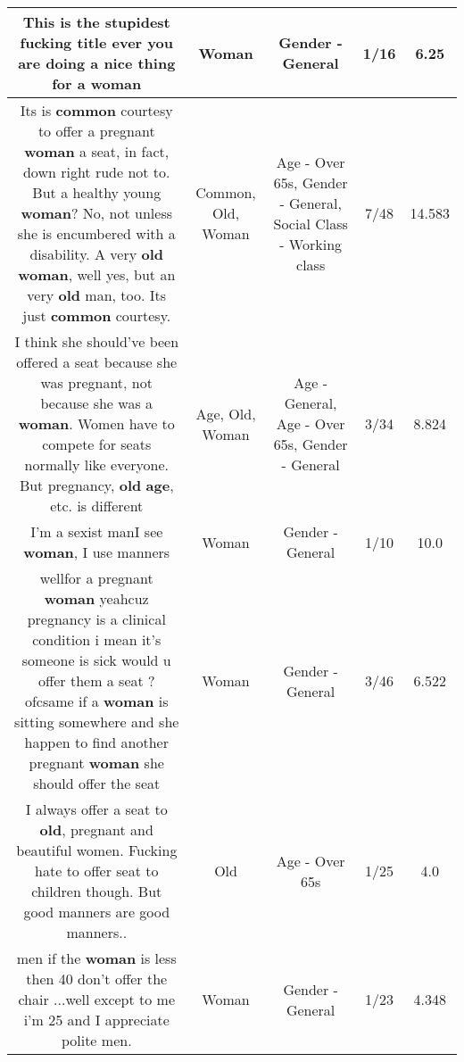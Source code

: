\documentclass[11pt]{article}
\newlength\mylength
\begin{document}
\begin{center}
\begin{longtable}{|C{.65\mylength}|C{.30\mylength}|C{.12\mylength}|C{.12\mylength}|C{.12\mylength}|}
  \small This is the stupidest fucking title ever you are doing a nice thing for a woman\normalsize   & Woman & Gender - General & 1/16 & 6.25 \\  \hline
  \small Its is \textbf{common} courtesy to offer a pregnant \textbf{woman} a seat, in fact, down right rude not to.  But a healthy young \textbf{woman}?  No, not unless she is encumbered with a disability.  A very \textbf{old} \textbf{woman}, well yes, but an very \textbf{old} man, too.  Its just \textbf{common} courtesy.\normalsize   & Common, Old, Woman & Age - Over 65s, Gender - General, Social Class - Working class & 7/48 & 14.583 \\  \hline
  \small I think she should've been offered a seat because she was pregnant, not because she was a \textbf{woman}. Women have to compete for seats normally like everyone. But pregnancy, \textbf{old} \textbf{age}, etc. is different\normalsize   & Age, Old, Woman & Age - General, Age - Over 65s, Gender - General & 3/34 & 8.824 \\  \hline
  \small I'm a sexist manI see \textbf{woman}, I use manners\normalsize   & Woman & Gender - General & 1/10 & 10.0 \\  \hline
  \small wellfor a pregnant \textbf{woman} yeahcuz pregnancy is a clinical condition i mean it's someone is sick would u offer them a seat ? ofcsame if a \textbf{woman} is sitting somewhere and she happen to find another pregnant \textbf{woman} she should offer the seat\normalsize   & Woman & Gender - General & 3/46 & 6.522 \\  \hline
  \small I always offer a seat to \textbf{old}, pregnant and beautiful women. Fucking hate to offer seat to children though. But good manners are good manners..\normalsize   & Old & Age - Over 65s & 1/25 & 4.0 \\  \hline
  \small men if the \textbf{woman} is less then 40 don't offer the chair ...well except to me i'm 25 and I appreciate polite men.\normalsize   & Woman & Gender - General & 1/23 & 4.348 \\  \hline

\end{longtable}
\end{center}
\end{document}
